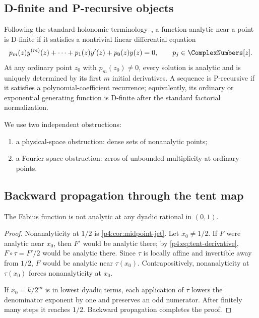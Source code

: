 \documentclass[11pt]{article}
\numberwithin{equation}{section}
\theoremstyle{definition}
\theoremstyle{remark}
\begin{document}
\subsection{D-finite and P-recursive objects}
Following the standard holonomic terminology~\cite{p4:stanley}, a function analytic near a point is D-finite if it satisfies a nontrivial linear differential equation
\begin{equation}
 p_m(z)y^{(m)}(z)+\cdots+p_1(z)y'(z)+p_0(z)y(z)=0,
 \qquad p_j\in\ComplexNumbers[z].
 \label{p4:eq:Dfinite}
\end{equation}
At any ordinary point $z_0$ with $p_m(z_0)\ne0$, every solution is analytic and is uniquely determined by its first $m$ initial derivatives.  A sequence is P-recursive if it satisfies a polynomial-coefficient recurrence; equivalently, its ordinary or exponential generating function is D-finite after the standard factorial normalization.

We use two independent obstructions:
\begin{enumerate}
\item a physical-space obstruction: dense sets of nonanalytic points;
\item a Fourier-space obstruction: zeros of unbounded multiplicity at ordinary points.
\end{enumerate}

\subsection{Backward propagation through the tent map}
\begin{proposition}
\label{p4:prop:dyadic-nonanalyticity}
The Fabius function is not analytic at any dyadic rational in $(0,1)$.
\end{proposition}

\begin{proof}
Nonanalyticity at $1/2$ is \cref{p4:cor:midpoint-jet}.  Let $x_0\ne1/2$.  If $F$ were analytic near $x_0$, then $F'$ would be analytic there; by \eqref{p4:eq:tent-derivative}, $F\circ\tau=F'/2$ would be analytic there.  Since $\tau$ is locally affine and invertible away from $1/2$, $F$ would be analytic near $\tau(x_0)$.  Contrapositively, nonanalyticity at $\tau(x_0)$ forces nonanalyticity at $x_0$.

If $x_0=k/2^m$ is in lowest dyadic terms, each application of $\tau$ lowers the denominator exponent by one and preserves an odd numerator.  After finitely many steps it reaches $1/2$.  Backward propagation completes the proof.
\end{proof}
\end{document}
